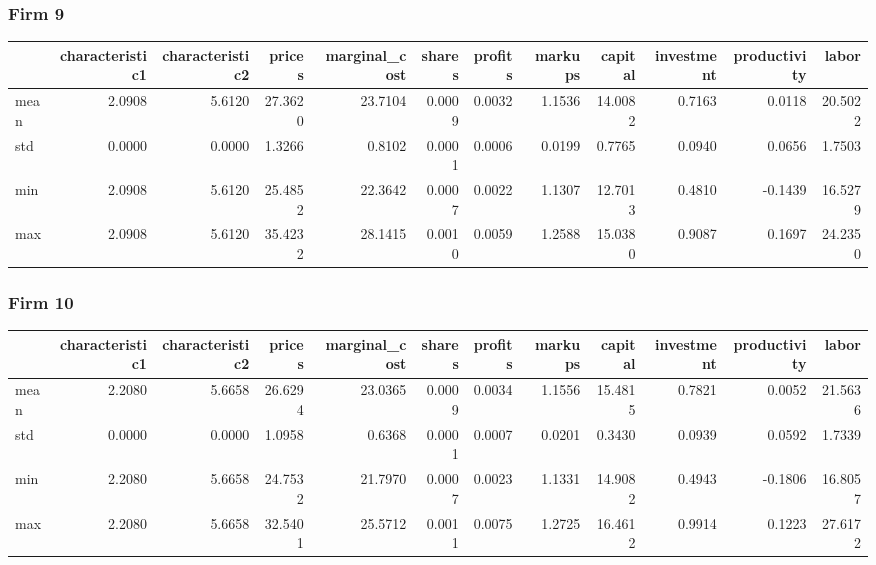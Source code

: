 \subsubsection*{Firm 9}
\begin{tabular}{lrrrrrrrrrrr}
\toprule
{} &  characteristic1 &  characteristic2 &  prices &  marginal\_cost &  shares &  profits &  markups &  capital &  investment &  productivity &   labor \\
\midrule
mean &           2.0908 &           5.6120 & 27.3620 &        23.7104 &  0.0009 &   0.0032 &   1.1536 &  14.0082 &      0.7163 &        0.0118 & 20.5022 \\
std  &           0.0000 &           0.0000 &  1.3266 &         0.8102 &  0.0001 &   0.0006 &   0.0199 &   0.7765 &      0.0940 &        0.0656 &  1.7503 \\
min  &           2.0908 &           5.6120 & 25.4852 &        22.3642 &  0.0007 &   0.0022 &   1.1307 &  12.7013 &      0.4810 &       -0.1439 & 16.5279 \\
max  &           2.0908 &           5.6120 & 35.4232 &        28.1415 &  0.0010 &   0.0059 &   1.2588 &  15.0380 &      0.9087 &        0.1697 & 24.2350 \\
\bottomrule
\end{tabular}


 \subsubsection*{Firm 10}
\begin{tabular}{lrrrrrrrrrrr}
\toprule
{} &  characteristic1 &  characteristic2 &  prices &  marginal\_cost &  shares &  profits &  markups &  capital &  investment &  productivity &   labor \\
\midrule
mean &           2.2080 &           5.6658 & 26.6294 &        23.0365 &  0.0009 &   0.0034 &   1.1556 &  15.4815 &      0.7821 &        0.0052 & 21.5636 \\
std  &           0.0000 &           0.0000 &  1.0958 &         0.6368 &  0.0001 &   0.0007 &   0.0201 &   0.3430 &      0.0939 &        0.0592 &  1.7339 \\
min  &           2.2080 &           5.6658 & 24.7532 &        21.7970 &  0.0007 &   0.0023 &   1.1331 &  14.9082 &      0.4943 &       -0.1806 & 16.8057 \\
max  &           2.2080 &           5.6658 & 32.5401 &        25.5712 &  0.0011 &   0.0075 &   1.2725 &  16.4612 &      0.9914 &        0.1223 & 27.6172 \\
\bottomrule
\end{tabular}


